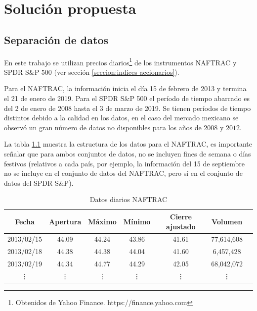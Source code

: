 \documentclass[12pt]{report}
\theoremstyle{break}
\theoremstyle{break}
\begin{document}
\chapter[Capítulo \thechapter: Solución propuesta]{Solución propuesta}
\label{capitulo:solucion propuesta}

\section{Separación de datos}
\label{seccion:separacion de datos}
En este trabajo se utilizan precios diarios\footnote{Obtenidos de Yahoo Finance. https://finance.yahoo.com} de los instrumentos NAFTRAC y SPDR S\&P 500 (ver sección \ref{seccion:indices accionarios}).

Para el NAFTRAC, la información inicia el día 15 de febrero de 2013 y termina el 21 de enero de 2019. Para el SPDR S\&P 500 el período de tiempo abarcado es del 2 de enero de 2008 hasta  el 3 de marzo de 2019. Se tienen períodos de tiempo distintos debido a la calidad en los datos, en el caso del mercado mexicano se observó un gran número de datos no disponibles para los años de $2008$ y $2012$.

La tabla \ref{tabla:Ejemplo datos diarios NAFTRAC} muestra la estructura de los datos para el NAFTRAC, es importante señalar que para ambos conjuntos de datos, no se incluyen fines de semana o días festivos (relativos a cada país, por ejemplo, la información del 15 de septiembre no se incluye en el conjunto de datos del NAFTRAC, pero sí en el conjunto de datos del SPDR S\&P).

\begin{table}[h]
\centering
\begin{tabular}{ccccccc}
\hline
\textbf{Fecha} & \textbf{Apertura} & \textbf{Máximo} & \textbf{Mínimo} & \textbf{Cierre  ajustado} &  \textbf{Volumen} \\
\hline
2013/02/15 & 44.09 & 44.24 & 43.86  & 41.61 & 77,614,608\\
2013/02/18 & 44.38 & 44.38 & 44.04  & 41.60 & 6,457,428\\
2013/02/19 & 44.34 & 44.77 & 44.29  & 42.05 & 68,042,072\\
\vdots & \vdots & \vdots & \vdots  & \vdots & \vdots \\
\hline
\end{tabular}
\caption{\label{tabla:Ejemplo datos diarios NAFTRAC} Datos diarios NAFTRAC}
\end{table}
\end{document}
